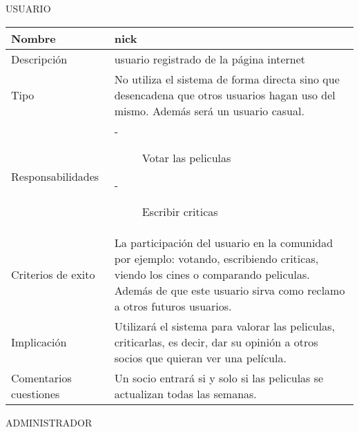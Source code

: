 \documentclass{article}
\begin{document}
USUARIO
\begin{table}[H]
    \begin{tabular}{||p{4cm} | p{7cm} ||}
    \hline
    \hline
    Nombre & nick \\
    \hline
    Descripción & usuario registrado  de la página internet\\
    \hline
    Tipo & No utiliza el sistema de forma directa sino que desencadena que otros usuarios hagan uso del mismo. Además será un usuario casual. \\
    \hline
    Responsabilidades &
        \begin{description}
        \item[-]Votar las peliculas 
        \item[-]Escribir criticas 
        \end{description}\\
    \hline
    Criterios de exito & La participación del usuario en la comunidad por ejemplo: votando, escribiendo criticas, viendo los cines o comparando peliculas. Además de que este usuario sirva como reclamo a otros futuros usuarios. \\
    \hline
    Implicación & Utilizará el sistema para valorar las peliculas, criticarlas, es decir, dar su opinión a otros socios que quieran ver una película. \\
    \hline
    Comentarios cuestiones & Un socio entrará si y solo si las peliculas se actualizan todas las semanas. \\
    \hline
    \hline
    \end{tabular}
\end{table}
\vspace{0.845cm}
ADMINISTRADOR
\end{document}
